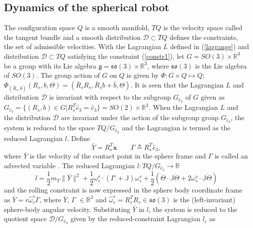 \documentclass{ifacconf}
\begin{document}
\subsection{Dynamics of the spherical robot} 
The configuration space $Q$ is a smooth manifold, $TQ$ is the velocity space called the tangent bundle and a smooth distribution $\mathcal{D} \subset TQ$ defines the constraints, the set of admissible velocities. 
With the Lagrangian $L$ defined in (\ref{lagrange}) and distribution $\mathcal{D}\subset TQ$ satisfying the constraint (\ref{constr1}), let $G =SO(3) \times \mathbb{R}^{3}$ be a group with its Lie algebra $\mathfrak{g} = \mathfrak{so}(3) \times \mathbb{R}^{3}$, where $\mathfrak{so}(3)$ is the Lie algebra of $SO(3)$. The group action of $G$ on $Q$ is given by $\Phi: G \times Q \mapsto Q$; $\Phi_{(\bar{R}_{s},\bar{b})}(R_{s},b,\Theta) = (\bar{R}_{s}R_{s},\bar{R}_{s}b + \bar{b}, \Theta)$. It is seen that the Lagrangian $L$ and distribution $\mathcal{D}$ is invariant with respect to the subgroup $G_{\hat{e}_{3}}$ of $G$ given as
$ G_{\hat{e}_{3}}=\lbrace (R_{s},b)\in G \vert R_{s}^{T} \hat{e}_{3}=\hat{e}_{3} \rbrace = SO(2)\times \mathbb{R}^{2}$. When the Lagrangian $L$ and the distribution $\mathcal{D}$ are invariant under the action of the subgroup group $G_{\hat{e}_{3}}$, the system is reduced to the space $TQ/G_{\hat{e}_{3}}$ and the Lagrangian is termed as the reduced Lagrangian $l$. Define 
\begin{equation}\label{advection}
\bar{Y}= R_{s}^{T} \dot{\mathbf{x}} \quad \quad \Gamma\triangleq R_{s}^{T}\hat{e}_{3},
\end{equation}
where $\bar{Y}$ is the velocity of the contact point in the sphere frame and $\Gamma$ is called an advected variable \citep{lhmnlc2012}. The reduced Lagrangian $l: TQ/G_{\hat{e}_{3}} \longrightarrow \mathbb{R} $ 
\begin{equation}\label{equ2}
l = \frac{1}{2} m_{T} \|\bar{Y}\|^{2} + \frac{1}{2} \omega_{s}^{s}\cdot (I^{s} + \mathbb{J}) \omega_{s}^{s} + \frac{1}{2}\left( \dot{\Theta} \cdot \mathbb{J}\dot{\Theta} + 2 \omega_{s}^{s} \cdot \mathbb{J}\dot{\Theta}\right) 
\end{equation}
and the rolling constraint is now expressed in the sphere body coordinate frame as $\bar{Y} = r \widehat{\omega}_{s}^{s}\Gamma$, 
where $\bar{Y}$, $\Gamma$ $\in \mathbb{R}^{3}$ and $\widehat{\omega}_{s}^{s} = R_{s}^{T}\dot{R}_{s} \in \mathfrak{so}(3)$ is the (left-invariant) sphere-body angular velocity. Substituting $\bar{Y}$ in $l$, the system is reduced to the quotient space $\mathcal{D}/G_{\hat{e}_{3}}$ given by the reduced-constraint Lagrangian $l_{c}$ as
\end{document}

